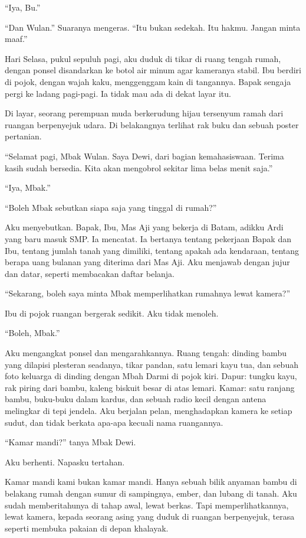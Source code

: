 \documentclass[11pt,twoside,openany]{book}
\makeatletter
\newcommand{\scenebreak}{\par\vspace{0.9em}{\centering\textsc{*\hspace{0.7em}*\hspace{0.7em}*}\par}\vspace{0.9em}\@afterindentfalse\@afterheading}
\makeatother
\begin{document}
``Iya, Bu.''

``Dan Wulan.'' Suaranya mengeras. ``Itu bukan sedekah. Itu hakmu. Jangan minta maaf.''

\scenebreak
Hari Selasa, pukul sepuluh pagi, aku duduk di tikar di ruang tengah rumah, dengan ponsel disandarkan ke botol air minum agar kameranya stabil. Ibu berdiri di pojok, dengan wajah kaku, menggenggam kain di tangannya. Bapak sengaja pergi ke ladang pagi-pagi. Ia tidak mau ada di dekat layar itu.

Di layar, seorang perempuan muda berkerudung hijau tersenyum ramah dari ruangan berpenyejuk udara. Di belakangnya terlihat rak buku dan sebuah poster pertanian.

``Selamat pagi, Mbak Wulan. Saya Dewi, dari bagian kemahasiswaan. Terima kasih sudah bersedia. Kita akan mengobrol sekitar lima belas menit saja.''

``Iya, Mbak.''

``Boleh Mbak sebutkan siapa saja yang tinggal di rumah?''

Aku menyebutkan. Bapak, Ibu, Mas Aji yang bekerja di Batam, adikku Ardi yang baru masuk SMP. Ia mencatat. Ia bertanya tentang pekerjaan Bapak dan Ibu, tentang jumlah tanah yang dimiliki, tentang apakah ada kendaraan, tentang berapa uang bulanan yang diterima dari Mas Aji. Aku menjawab dengan jujur dan datar, seperti membacakan daftar belanja.

``Sekarang, boleh saya minta Mbak memperlihatkan rumahnya lewat kamera?''

Ibu di pojok ruangan bergerak sedikit. Aku tidak menoleh.

``Boleh, Mbak.''

Aku mengangkat ponsel dan mengarahkannya. Ruang tengah: dinding bambu yang dilapisi plesteran seadanya, tikar pandan, satu lemari kayu tua, dan sebuah foto keluarga di dinding dengan Mbah Darmi di pojok kiri. Dapur: tungku kayu, rak piring dari bambu, kaleng biskuit besar di atas lemari. Kamar: satu ranjang bambu, buku-buku dalam kardus, dan sebuah radio kecil dengan antena melingkar di tepi jendela. Aku berjalan pelan, menghadapkan kamera ke setiap sudut, dan tidak berkata apa-apa kecuali nama ruangannya.

``Kamar mandi?'' tanya Mbak Dewi.

Aku berhenti. Napasku tertahan.

Kamar mandi kami bukan kamar mandi. Hanya sebuah bilik anyaman bambu di belakang rumah dengan sumur di sampingnya, ember, dan lubang di tanah. Aku sudah memberitahunya di tahap awal, lewat berkas. Tapi memperlihatkannya, lewat kamera, kepada seorang asing yang duduk di ruangan berpenyejuk, terasa seperti membuka pakaian di depan khalayak.
\end{document}
